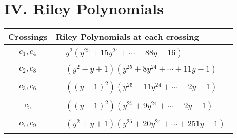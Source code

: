 \documentclass[1p]{elsarticle_modified}
\theoremstyle{definition}
\begin{document}
\centering \section*{ IV. Riley Polynomials}
\begin{tabular}{m{50pt}|m{274pt}}
Crossings & \hspace{64pt}Riley Polynomials at each crossing \\
\hline $$\begin{aligned}c_{1},c_{4}\end{aligned}$$&$\begin{aligned}
&y^2(y^{25}+15 y^{24}+\cdots-88 y-16)
\end{aligned}$\\
\hline $$\begin{aligned}c_{2},c_{8}\end{aligned}$$&$\begin{aligned}
&(y^2+y+1)(y^{25}+8 y^{24}+\cdots+11 y-1)
\end{aligned}$\\
\hline $$\begin{aligned}c_{3},c_{6}\end{aligned}$$&$\begin{aligned}
&((y-1)^2)(y^{25}-11 y^{24}+\cdots-2 y-1)
\end{aligned}$\\
\hline $$\begin{aligned}c_{5}\end{aligned}$$&$\begin{aligned}
&((y-1)^2)(y^{25}+9 y^{24}+\cdots-2 y-1)
\end{aligned}$\\
\hline $$\begin{aligned}c_{7},c_{9}\end{aligned}$$&$\begin{aligned}
&(y^2+y+1)(y^{25}+20 y^{24}+\cdots+251 y-1)
\end{aligned}$\\
\hline
\end{tabular}
\vskip 2pc
\end{document}
